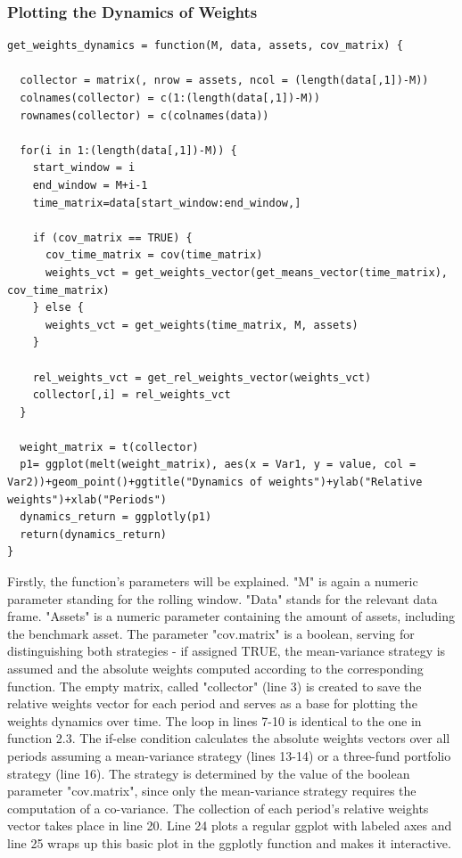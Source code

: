 \documentclass{article}
\begin{document}
\subsubsection{Plotting the Dynamics of Weights}
\begin{lstlisting}[caption={This example shows how the dynamics of weights are plotted in R.}, label=code:1, frame=single]
get_weights_dynamics = function(M, data, assets, cov_matrix) {

  collector = matrix(, nrow = assets, ncol = (length(data[,1])-M))
  colnames(collector) = c(1:(length(data[,1])-M))
  rownames(collector) = c(colnames(data))
  
  for(i in 1:(length(data[,1])-M)) {
    start_window = i
    end_window = M+i-1
    time_matrix=data[start_window:end_window,]
    
    if (cov_matrix == TRUE) { 
      cov_time_matrix = cov(time_matrix)
      weights_vct = get_weights_vector(get_means_vector(time_matrix), cov_time_matrix)
    } else { 
      weights_vct = get_weights(time_matrix, M, assets)
    }
  
    rel_weights_vct = get_rel_weights_vector(weights_vct)
    collector[,i] = rel_weights_vct
  }
  
  weight_matrix = t(collector)
  p1= ggplot(melt(weight_matrix), aes(x = Var1, y = value, col = Var2))+geom_point()+ggtitle("Dynamics of weights")+ylab("Relative weights")+xlab("Periods")
  dynamics_return = ggplotly(p1)
  return(dynamics_return)
}
\end{lstlisting}
Firstly, the function's parameters will be explained. "M" is again a numeric parameter standing for the rolling window. "Data" stands for the relevant data frame. "Assets" is a numeric parameter containing the amount of assets, including the benchmark asset. The parameter "cov.matrix" is a boolean, serving for distinguishing both strategies - if assigned TRUE, the mean-variance strategy is assumed and the absolute weights computed according to the corresponding function. The empty matrix, called "collector" (line 3) is created to save the relative weights vector for each period and serves as a base for plotting the weights dynamics over time. The loop in lines 7-10 is identical to the one in function 2.3. The if-else condition calculates the absolute weights vectors over all periods assuming a mean-variance strategy (lines 13-14) or a three-fund portfolio strategy (line 16). The strategy is determined by the value of the boolean parameter "cov.matrix", since only the mean-variance strategy requires the computation of a co-variance. The collection of each period's relative weights vector takes place in line 20. Line 24 plots a regular ggplot with labeled axes and line 25 wraps up this basic plot in the ggplotly function and makes it interactive.      
\end{document}

